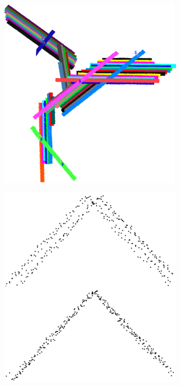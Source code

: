 \begin{figure}
	\centering
	\begin{subfigure}{0.4\linewidth}
		\includegraphics[width=\textwidth]{figs/lidar_strips.png}
		\label{fig:lidarStrips}
	\end{subfigure}
	\quad
	\begin{subfigure}{0.4\linewidth}
		\includegraphics[width=\textwidth]{figs/strip_adjustment.png}

\end{subfigure}
\end{figure}
